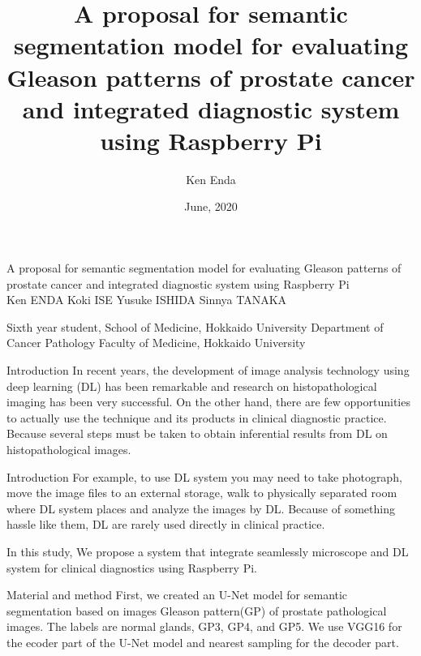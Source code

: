 \documentclass[
  dvipdfmx,
  xcolor={svgnames},
  hyperref={colorlinks,citecolor=DeepPink4,linkcolor=DarkRed,urlcolor=DarkBlue}
  ]{beamer}
\title{}
\title[A proposal of semantic segmentation model for Gleason patterns and integrated diagnostic system using Raspberry Pi]{A proposal for semantic segmentation model for evaluating Gleason patterns of prostate cancer and integrated diagnostic system using Raspberry Pi}
\author{Ken Enda}
\institute{Department of Cancer Pathology Faculty of Medicine, HOKKAIDO UNIVERSITY}
\date[]{June, 2020}
\begin{document}
\nocite{*}

\begin{frame}{}
  \huge A proposal for semantic segmentation model for evaluating Gleason patterns of prostate cancer and integrated diagnostic system using Raspberry Pi
  \\[5mm]
  \large Ken ENDA \cite{student} Koki ISE\cite{student} Yusuke ISHIDA\cite{teacher} Sinnya TANAKA\cite{teacher}
  \begin{thebibliography}{99}
    \beamertemplatetextbibitems
    \setlength{\itemsep}{-.5zw}
     Sixth year student, School of Medicine, Hokkaido University
     Department of Cancer Pathology Faculty of Medicine, Hokkaido University
  \end{thebibliography}
\end{frame}

\begin{frame}{Introduction}
  In recent years, the development of image analysis technology using deep learning (DL) has been remarkable and research on histopathological imaging has been very successful.  On the other hand, there are few opportunities to actually use the technique and its products in clinical diagnostic practice. Because several steps must be taken to obtain inferential results from DL on histopathological images.
\end{frame}

\begin{frame}{Introduction}
  For example, to use DL system you may need to take photograph, move the image files to an external storage, walk to physically separated room where DL system places and analyze the images by DL. Because of something hassle like them, DL are rarely used directly in clinical practice. \par
  \vspace{0.5zh}
  In this study, We propose a system that integrate seamlessly microscope and DL system for clinical diagnostics using Raspberry Pi.
\end{frame}


\begin{frame}{Material and method}
  First, we created an U-Net\cite{unet} model for semantic segmentation based on images Gleason pattern(GP) of prostate pathological images. The labels are normal glands, GP3, GP4, and GP5. We use VGG16\cite{vgg} for the ecoder part of the U-Net model and nearest sampling for the decoder part.
\end{frame}
\end{document}
